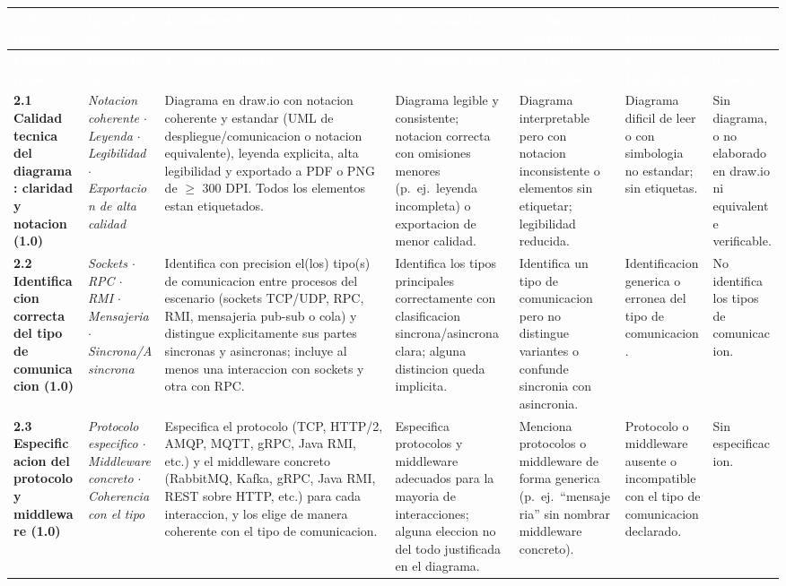 \documentclass[10pt]{article}
\newcommand{\rubheader}{\rowcolor{uteqBlue}\textbf{\textcolor{white}{Criterio (peso)}} & \textbf{\textcolor{white}{Indicadores}} & \textbf{\textcolor{white}{4 -- Sobresaliente}} & \textbf{\textcolor{white}{3 -- Satisfactorio}} & \textbf{\textcolor{white}{2 -- En desarrollo}} & \textbf{\textcolor{white}{1 -- Insuficiente}} & \textbf{\textcolor{white}{0 -- Ausente}}\\\hline}
\begin{document}
\begin{xltabular}{\textwidth}{|>{\RaggedRight\small}p{2.7cm}|>{\RaggedRight\small}p{2.8cm}|>{\RaggedRight\small}X|>{\RaggedRight\small}X|>{\RaggedRight\small}X|>{\RaggedRight\small}X|>{\RaggedRight\small}X|}
	\hline
	\rubheader
	\endfirsthead
	\hline
	\rubheader
	\endhead
	\textbf{2.1 Calidad tecnica del diagrama: claridad y notacion (1.0)} & \textit{Notacion coherente $\cdot$ Leyenda $\cdot$ Legibilidad $\cdot$ Exportacion de alta calidad} & Diagrama en draw.io con notacion coherente y estandar (UML de despliegue/comunicacion o notacion equivalente), leyenda explicita, alta legibilidad y exportado a PDF o PNG de $\geq$ 300 DPI. Todos los elementos estan etiquetados. & Diagrama legible y consistente; notacion correcta con omisiones menores (p.\ ej.\ leyenda incompleta) o exportacion de menor calidad. & Diagrama interpretable pero con notacion inconsistente o elementos sin etiquetar; legibilidad reducida. & Diagrama dificil de leer o con simbologia no estandar; sin etiquetas. & Sin diagrama, o no elaborado en draw.io ni equivalente verificable.\\
	\hline
	\textbf{2.2 Identificacion correcta del tipo de comunicacion (1.0)} & \textit{Sockets $\cdot$ RPC $\cdot$ RMI $\cdot$ Mensajeria $\cdot$ Sincrona/Asincrona} & Identifica con precision el(los) tipo(s) de comunicacion entre procesos del escenario (sockets TCP/UDP, RPC, RMI, mensajeria pub-sub o cola) y distingue explicitamente sus partes sincronas y asincronas; incluye al menos una interaccion con sockets y otra con RPC. & Identifica los tipos principales correctamente con clasificacion sincrona/asincrona clara; alguna distincion queda implicita. & Identifica un tipo de comunicacion pero no distingue variantes o confunde sincronia con asincronia. & Identificacion generica o erronea del tipo de comunicacion. & No identifica los tipos de comunicacion.\\
	\hline
	\textbf{2.3 Especificacion del protocolo y middleware (1.0)} & \textit{Protocolo especifico $\cdot$ Middleware concreto $\cdot$ Coherencia con el tipo} & Especifica el protocolo (TCP, HTTP/2, AMQP, MQTT, gRPC, Java RMI, etc.) y el middleware concreto (RabbitMQ, Kafka, gRPC, Java RMI, REST sobre HTTP, etc.) para cada interaccion, y los elige de manera coherente con el tipo de comunicacion. & Especifica protocolos y middleware adecuados para la mayoria de interacciones; alguna eleccion no del todo justificada en el diagrama. & Menciona protocolos o middleware de forma generica (p.\ ej.\ ``mensajeria'' sin nombrar middleware concreto). & Protocolo o middleware ausente o incompatible con el tipo de comunicacion declarado. & Sin especificacion.\\

\end{xltabular}
\end{document}
